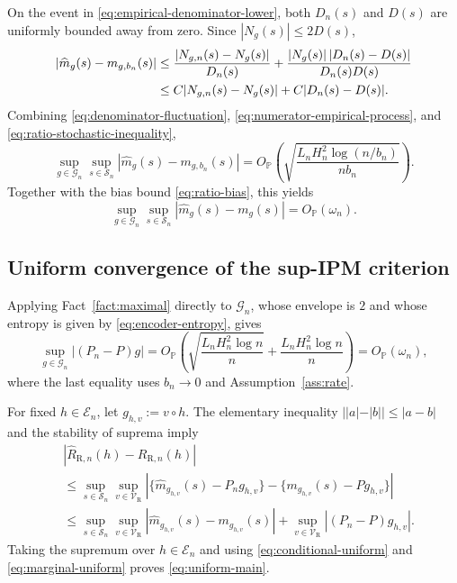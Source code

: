 \documentclass[11pt]{article}
\theoremstyle{remark}
\newcommand{\Pp}{\mathbb{P}}
\newcommand{\cS}{\mathcal{S}}
\newcommand{\cV}{\mathcal{V}}
\newcommand{\cG}{\mathcal{G}}
\newcommand{\cE}{\mathscr{E}}
\newcommand{\wh}{\widehat}
\begin{document}
On the event in \eqref{eq:empirical-denominator-lower}, both $D_n(s)$ and $D(s)$
are uniformly bounded away from zero.  Since $|N_g(s)|\le2D(s)$,
\begin{align}
  |\wh m_g(s)-m_{g,b_n}(s)|
  &\le
  \frac{|N_{g,n}(s)-N_g(s)|}{D_n(s)}
  +
  \frac{|N_g(s)|\,|D_n(s)-D(s)|}{D_n(s)D(s)}
  \notag\\
  &\le
  C|N_{g,n}(s)-N_g(s)|
  +C|D_n(s)-D(s)|.
  \label{eq:ratio-stochastic-inequality}
\end{align}
Combining \eqref{eq:denominator-fluctuation},
\eqref{eq:numerator-empirical-process}, and
\eqref{eq:ratio-stochastic-inequality},
\begin{equation}
  \sup_{g\in\cG_n}\sup_{s\in\cS_n}
  |\wh m_g(s)-m_{g,b_n}(s)|
  =
  O_{\Pp}\!\left(
    \sqrt{
      \frac{L_nH_n^2\log(n/b_n)}{nb_n}
    }
  \right).
  \label{eq:ratio-stochastic}
\end{equation}
Together with the bias bound \eqref{eq:ratio-bias}, this yields
\begin{equation}
  \sup_{g\in\cG_n}\sup_{s\in\cS_n}
  |\wh m_g(s)-m_g(s)|
  =O_{\Pp}(\omega_n).
  \label{eq:conditional-uniform}
\end{equation}

\subsection{Uniform convergence of the sup-IPM criterion}

Applying Fact~\ref{fact:maximal} directly to $\cG_n$, whose envelope is $2$ and
whose entropy is given by \eqref{eq:encoder-entropy}, gives
\begin{equation}
  \sup_{g\in\cG_n}|(P_n-P)g|
  =
  O_{\Pp}\!\left(
    \sqrt{\frac{L_nH_n^2\log n}{n}}
    +
    \frac{L_nH_n^2\log n}{n}
  \right)
  =O_{\Pp}(\omega_n),
  \label{eq:marginal-uniform}
\end{equation}
where the last equality uses $b_n\to0$ and Assumption~\ref{ass:rate}.

For fixed $h\in\cE_n$, let $g_{h,v}:=v\circ h$.  The elementary inequality
$||a|-|b||\le|a-b|$ and the stability of suprema imply
\begin{align*}
  &\left|
    \wh R_{\mathrm{R},n}(h)-R_{\mathrm{R},n}(h)
  \right|
  \\
  &\le
  \sup_{s\in\cS_n}\sup_{v\in\cV_{\mathrm{R}}}
  \left|
    \{\wh m_{g_{h,v}}(s)-P_ng_{h,v}\}
    -
    \{m_{g_{h,v}}(s)-Pg_{h,v}\}
  \right|
  \\
  &\le
  \sup_{s\in\cS_n}\sup_{v\in\cV_{\mathrm{R}}}
  |\wh m_{g_{h,v}}(s)-m_{g_{h,v}}(s)|
  +
  \sup_{v\in\cV_{\mathrm{R}}}|(P_n-P)g_{h,v}|.
\end{align*}
Taking the supremum over $h\in\cE_n$ and using
\eqref{eq:conditional-uniform} and \eqref{eq:marginal-uniform} proves
\eqref{eq:uniform-main}.
\end{document}
